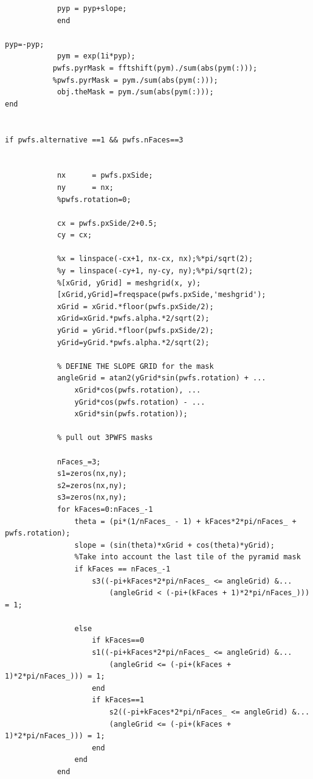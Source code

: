 \begin{lstlisting}
            pyp = pyp+slope;
            end
                
pyp=-pyp;
            pym = exp(1i*pyp);
           pwfs.pyrMask = fftshift(pym)./sum(abs(pym(:)));
           %pwfs.pyrMask = pym./sum(abs(pym(:)));
            obj.theMask = pym./sum(abs(pym(:)));
end
            
     
if pwfs.alternative ==1 && pwfs.nFaces==3
    
            
            nx      = pwfs.pxSide;
            ny      = nx;
            %pwfs.rotation=0;
            
            cx = pwfs.pxSide/2+0.5;
            cy = cx;
            
            %x = linspace(-cx+1, nx-cx, nx);%*pi/sqrt(2);
            %y = linspace(-cy+1, ny-cy, ny);%*pi/sqrt(2);
            %[xGrid, yGrid] = meshgrid(x, y);
            [xGrid,yGrid]=freqspace(pwfs.pxSide,'meshgrid');
            xGrid = xGrid.*floor(pwfs.pxSide/2);
            xGrid=xGrid.*pwfs.alpha.*2/sqrt(2);
            yGrid = yGrid.*floor(pwfs.pxSide/2);
            yGrid=yGrid.*pwfs.alpha.*2/sqrt(2);

            % DEFINE THE SLOPE GRID for the mask
            angleGrid = atan2(yGrid*sin(pwfs.rotation) + ...
                xGrid*cos(pwfs.rotation), ...
                yGrid*cos(pwfs.rotation) - ...
                xGrid*sin(pwfs.rotation));

            % pull out 3PWFS masks
            
            nFaces_=3;
            s1=zeros(nx,ny);
            s2=zeros(nx,ny);
            s3=zeros(nx,ny);
            for kFaces=0:nFaces_-1
                theta = (pi*(1/nFaces_ - 1) + kFaces*2*pi/nFaces_ + pwfs.rotation);
                slope = (sin(theta)*xGrid + cos(theta)*yGrid);
                %Take into account the last tile of the pyramid mask
                if kFaces == nFaces_-1
                    s3((-pi+kFaces*2*pi/nFaces_ <= angleGrid) &...
                        (angleGrid < (-pi+(kFaces + 1)*2*pi/nFaces_))) = 1;
                        
                else
                    if kFaces==0
                    s1((-pi+kFaces*2*pi/nFaces_ <= angleGrid) &...
                        (angleGrid <= (-pi+(kFaces + 1)*2*pi/nFaces_))) = 1;
                    end
                    if kFaces==1
                        s2((-pi+kFaces*2*pi/nFaces_ <= angleGrid) &...
                        (angleGrid <= (-pi+(kFaces + 1)*2*pi/nFaces_))) = 1;
                    end
                end
            end
                

\end{lstlisting}
